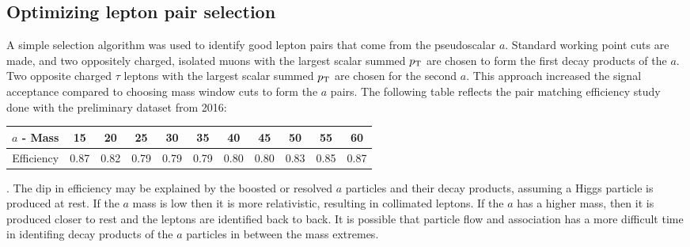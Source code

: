 \subsection{Optimizing lepton pair selection}
\label{sec:selection}
A simple selection algorithm was used to identify good lepton pairs that come from the pseudoscalar $a$. 
Standard working point cuts are made, and two oppositely charged, isolated muons with the largest scalar summed $p_{\mathrm{T}}$ are chosen to form the first decay products of the $a$. 
Two opposite charged $\tau$ leptons with the largest scalar summed $p_{\mathrm{T}}$ are chosen for the second $a$. 
This approach increased the signal acceptance compared to choosing mass window cuts to form the $a$ pairs. 
The following table reflects the pair matching efficiency study done with the preliminary dataset from 2016:
\begin{table}[h!tbp]
\begin{center}
    \label{tab:paireff}
\begin{tabular}{|c|c|c|c|c|c|c|c|c|c|c|}\hline
$a$ - Mass & 15     & 20    & 25    & 30    & 35    & 40    & 45    & 50    & 55    & 60 \\\hline
Efficiency & 0.87   & 0.82  &0.79   & 0.79  & 0.79  & 0.80  & 0.80  & 0.83  & 0.85  & 0.87 \\\hline 
\end{tabular}
\end{center}
\end{table}.
The dip in efficiency may be explained by the boosted or resolved $a$ particles and their decay products, assuming a Higgs particle is produced at rest. If the $a$ mass is low then it is more relativistic, resulting in collimated leptons. If the $a$ has a higher mass, then it is produced closer to rest and the leptons are identified back to back. It is possible that particle flow and association has a more difficult time in identifing decay products of the $a$ particles in between the mass extremes.

